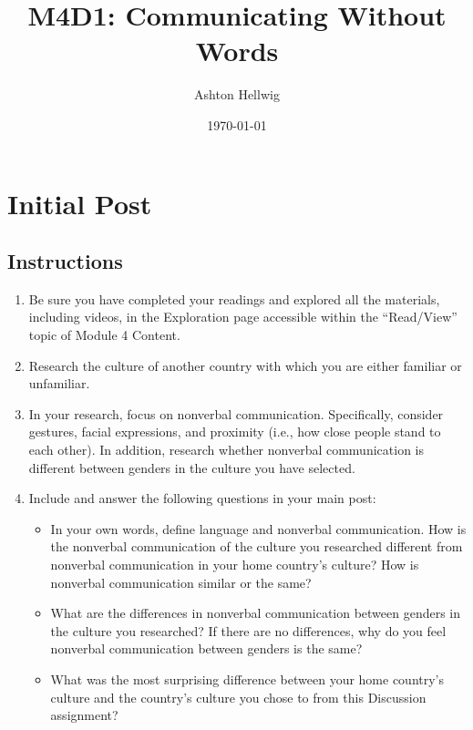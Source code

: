 \documentclass[stu,12pt]{apa7}
\title{%
    M4D1: Communicating Without Words
  }
\author{Ashton Hellwig}
\date{\today}
\begin{document}
  \maketitle

  \section{Initial Post}
    \subsection*{Instructions}
      \begin{enumerate}
        \item Be sure you have completed your readings and explored all the
          materials, including videos, in the Exploration page accessible
          within the ``Read/View'' topic of Module 4 Content.

        \item Research the culture of another country with which you are
          either familiar or unfamiliar.

        \item In your research, focus on nonverbal communication.
          Specifically, consider gestures, facial expressions, and proximity
          (i.e., how close people stand to each other). In addition, research
          whether nonverbal communication is different between genders in the
          culture you have selected.

        \item Include and answer the following questions in your main post:
          \begin{itemize}
            \item In your own words, define language and nonverbal
              communication. How is the nonverbal communication of the culture
              you researched different from nonverbal communication in your
              home country's culture? How is nonverbal communication similar
              or the same?

            \item What are the differences in nonverbal communication between
              genders in the culture you researched? If there are no
              differences, why do you feel nonverbal communication between
              genders is the same?

            \item What was the most surprising difference between your home
              country's culture and the country's culture you chose to from
              this Discussion assignment?


\end{itemize}
\end{enumerate}
\end{document}
